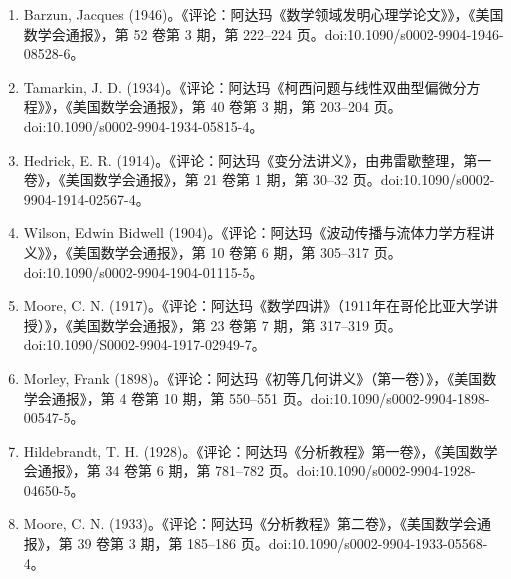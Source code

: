 \begin{enumerate}
\item Barzun, Jacques (1946)。《评论：阿达玛《数学领域发明心理学论文》》，《美国数学会通报》，第 52 卷第 3 期，第 222–224 页。doi:10.1090/s0002-9904-1946-08528-6。
\item Tamarkin, J. D. (1934)。《评论：阿达玛《柯西问题与线性双曲型偏微分方程》》，《美国数学会通报》，第 40 卷第 3 期，第 203–204 页。doi:10.1090/s0002-9904-1934-05815-4。
\item Hedrick, E. R. (1914)。《评论：阿达玛《变分法讲义》，由弗雷歇整理，第一卷》，《美国数学会通报》，第 21 卷第 1 期，第 30–32 页。doi:10.1090/s0002-9904-1914-02567-4。
\item Wilson, Edwin Bidwell (1904)。《评论：阿达玛《波动传播与流体力学方程讲义》》，《美国数学会通报》，第 10 卷第 6 期，第 305–317 页。doi:10.1090/s0002-9904-1904-01115-5。
\item Moore, C. N. (1917)。《评论：阿达玛《数学四讲》（1911年在哥伦比亚大学讲授）》，《美国数学会通报》，第 23 卷第 7 期，第 317–319 页。doi:10.1090/S0002-9904-1917-02949-7。
\item Morley, Frank (1898)。《评论：阿达玛《初等几何讲义》（第一卷）》，《美国数学会通报》，第 4 卷第 10 期，第 550–551 页。doi:10.1090/s0002-9904-1898-00547-5。
\item Hildebrandt, T. H. (1928)。《评论：阿达玛《分析教程》第一卷》，《美国数学会通报》，第 34 卷第 6 期，第 781–782 页。doi:10.1090/s0002-9904-1928-04650-5。
\item Moore, C. N. (1933)。《评论：阿达玛《分析教程》第二卷》，《美国数学会通报》，第 39 卷第 3 期，第 185–186 页。doi:10.1090/s0002-9904-1933-05568-4。
\end{enumerate}